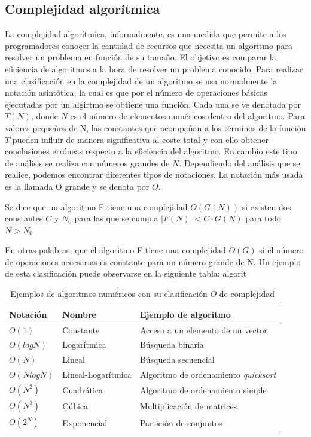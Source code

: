 \subsection{Complejidad algorítmica}
La complejidad algorítmica, informalmente, es una medida que permite a los programadores conocer la cantidad de recursos que necesita un algoritmo para resolver un problema en función de su tamaño. El objetivo es
comparar la eficiencia de algoritmos a la hora de resolver un problema conocido\cite{Cohen1998}. Para realizar una clasificación en la complejidad de un algoritmo
se usa normalmente la notación asintótica, la cual es que por el número de operaciones básicas ejecutadas por un algirtmo se obtiene una función. Cada
una se ve denotada por $T(N)$, donde $N$ es el número de elementos numéricos dentro del algoritmo. Para valores pequeños de N, las constantes 
que acompañan a los términos de la función $T$ pueden influir de manera significativa al coste total y con ello obtener conclusiones erróneas respecto
a la eficiencia del algoritmo. En cambio este tipo de análisis se realiza con números grandes de $N$. Dependiendo del análisis que se realice, podemos
encontrar diferentes tipos de notaciones. La notación más usada es la llamada O grande y se denota por $O$.
\begin{defi}
Se dice que un algoritmo F tiene una complejidad $O(G(N))$ si existen dos constantes $C$ y $N_0$ para las que se cumpla $|F(N)|<C\cdot G(N)$ para todo
$N>N_0$
\end{defi}
En otras palabras, que el algoritmo F tiene una complejidad $O(G)$ si el número de operaciones necesarias es constante para un número grande de N. Un ejemplo
de esta clasificación puede observarse en la siguiente tabla: algorit
\begin{table}[H]
    \centering
    \begin{tabular}{lll}
        \hline
        Notación & Nombre & Ejemplo de algoritmo \\
        \hline
        $O(1)$ & Constante & Acceso a un elemento de un vector\\ 
        $O(log N)$ & Logarítmica& Búsqueda binaria\\
        $O(N)$ & Lineal & Búsqueda secuencial\\
        $O(N log N)$ & Lineal-Logarítmica& Algoritmo de ordenamiento \textit{quicksort}\\
        $O(N^2)$ &Cuadrática & Algoritmo de ordenamiento simple\\
        $O(N^3)$ &Cúbica & Multiplicación de matrices\\
        $O(2^N)$ &Exponencial & Partición de conjuntos\\ \hline
    \end{tabular}
    \caption{Ejemplos de algoritmos numéricos con su clasificación $O$ de complejidad}
    \label{tabla:notacion-O}
\end{table}
